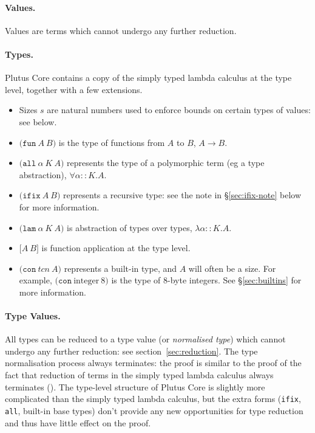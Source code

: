 \documentclass[a4paper]{article}
\newcommand{\keyword}[1]{\texttt{#1}}
\newcommand{\construct}[1]{\texttt{(} #1 \texttt{)}}
\newcommand{\funT}[2]{\construct{\keyword{fun} ~ #1 ~ #2}}
\newcommand{\ifixT}[2]{\construct{\keyword{ifix} ~ #1 ~ #2}}
\newcommand{\fixT}{\ifixT}
\newcommand{\allT}[3]{\construct{\keyword{all} ~ #1 ~ #2 ~ #3}}
\newcommand{\conT}[2]{\construct{\keyword{con} ~ #1 ~ #2}}
\newcommand{\lamT}[3]{\construct{\keyword{lam} ~ #1 ~ #2 ~ #3}}
\newcommand{\appT}[2]{\texttt{[} #1 ~ #2 \texttt{]}}
\begin{document}
\paragraph{Values.} Values are terms which cannot undergo any further reduction.

\paragraph{Types.} Plutus Core contains a copy of the simply typed lambda calculus
  at the type level, together with a few extensions.
\begin{itemize}
\item Sizes $s$ are natural numbers used to enforce bounds on certain types of values: see below.
\item $\funT{A}{B}$ is the type of functions from $A$ to $B$, $A \rightarrow B$.
\item $\allT{\alpha}{K}{A}$ represents the type of a polymorphic term (eg a type abstraction), $\forall \alpha{::}K.A$.
\item $\fixT{A}{B}$ represents a recursive type: see the note in \S\ref{sec:ifix-note} below for more information.
\item $\lamT{\alpha}{K}{A}$ is abstraction of types over types, $\lambda \alpha{::}K.A$.
\item $\appT{A}{B}$ is function application at the type level.
\item $\conT{tcn}{A}$ represents a built-in type, and $A$ will often be a size.  For example, $\conT{\textrm{integer}}{8}$
is the type of 8-byte integers.  See \S\ref{sec:builtins} for more information.
\end{itemize}

\paragraph{Type Values.} All types can be reduced to a type value (or
  \textit{normalised type}) which cannot undergo any further
  reduction: see section~\ref{sec:reduction}.  The type normalisation
  process always terminates: the proof is similar to the proof of the
  fact that reduction of terms in the simply typed lambda calculus
  always terminates (\cite[\S12]{Pierce:TAPL}).  The type-level
  structure of Plutus Core is slightly more complicated than the
  simply typed lambda calculus, but the extra forms (\texttt{ifix},
  \texttt{all}, built-in base types) don't provide any new
  opportunities for type reduction and thus have little effect on the
  proof.
\end{document}
